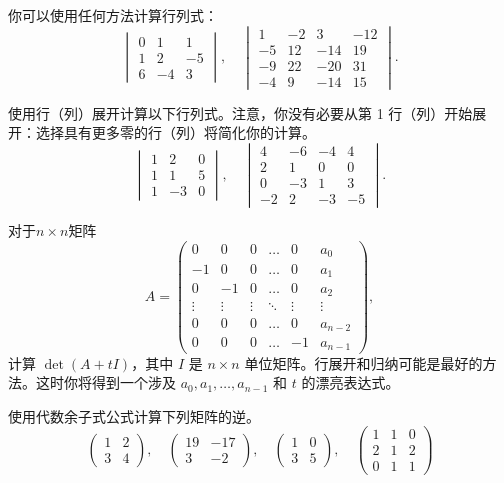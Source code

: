 \begin{problemset}
\item \label{ex:03-05-01} 你可以使用任何方法计算行列式：
$$\begin{vmatrix} 0 & 1 & 1 \\ 1 & 2 & -5 \\ 6 & -4 & 3 \end{vmatrix},\quad \begin{vmatrix} 1 & -2 & 3 &-12 \\ -5 & 12 & -14 & 19 \\ -9 & 22 & -20 & 31 \\ -4 & 9 & -14 & 15 \end{vmatrix}.$$
\item \label{ex:03-05-02} 使用行（列）展开计算以下行列式。注意，你没有必要从第 1 行（列）开始展开：选择具有更多零的行（列）将简化你的计算。
$$\begin{vmatrix} 1 & 2 & 0 \\ 1 & 1 & 5 \\ 1 & -3 & 0 \end{vmatrix},\quad\begin{vmatrix} 4 & -6 & -4 & 4 \\ 2 & 1 & 0 & 0 \\ 0 & -3 & 1 & 3 \\ -2 & 2 & -3 & -5 \end{vmatrix}.$$
\item \label{ex:03-05-03} 对于$n \times n$矩阵
$$A = \begin{pmatrix} 0 & 0 & 0 & \dots & 0 & a_0 \\ -1 & 0 & 0 & \dots & 0 & a_1 \\ 0 & -1 & 0 & \dots & 0 & a_2 \\ \vdots & \vdots & \vdots & \ddots & \vdots & \vdots \\ 0 & 0 & 0 & \dots & 0 & a_{n-2} \\ 0 & 0 & 0 & \dots & -1 & a_{n-1} \end{pmatrix},$$
计算 $\det(A + tI)$，其中 $I$ 是 $n \times n$ 单位矩阵。行展开和归纳可能是最好的方法。这时你将得到一个涉及 $a_0, a_1, \dots, a_{n-1}$ 和 $t$ 的漂亮表达式。
\item \label{ex:03-05-04} 使用代数余子式公式计算下列矩阵的逆。$$\begin{pmatrix} 1 & 2 \\ 3 & 4 \end{pmatrix}, \quad \begin{pmatrix} 19 & -17 \\ 3 & -2 \end{pmatrix}, \quad \begin{pmatrix} 1 & 0 \\ 3 & 5 \end{pmatrix}, \quad \begin{pmatrix} 1 & 1 & 0 \\ 2 & 1 & 2 \\ 0 & 1 & 1 \end{pmatrix}$$

\end{problemset}
